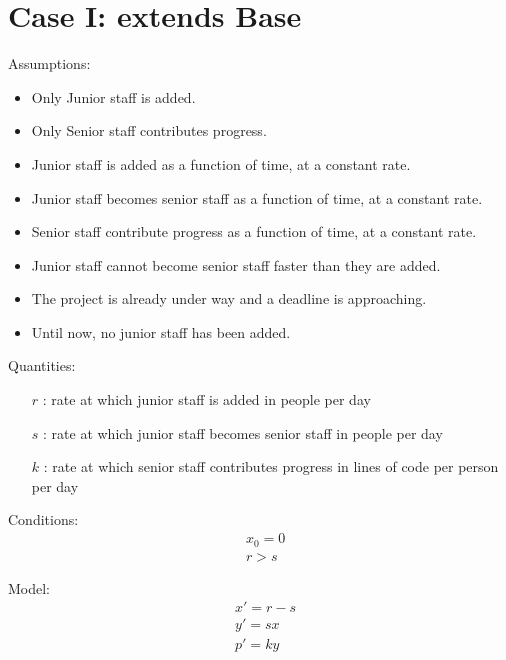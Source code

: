 \documentclass{article}
\newenvironment{atomize}
    {\begin{list} {} {
            \setlength\itemindent{0pt}
            \setlength\leftmargin{10pt}
            \setlength\labelwidth{0pt}
    }}
    {\end{list}}
\begin{document}
\section*{Case I: extends Base}
  \begin{atomize}
    \item Assumptions:
      \begin{itemize}
        \item Only Junior staff is added.
				\item Only Senior staff contributes progress.
				\item Junior staff is added as a function of time, at a constant rate.
				\item Junior staff becomes senior staff as a function of time, at a
				constant rate.
				\item Senior staff contribute progress as a function of time, at a
				constant rate.
				\item Junior staff cannot become senior staff faster than they are
				added.
				\item The project is already under way and a deadline is approaching.
				\item Until now, no junior staff has been added.
      \end{itemize}

		\item Quantities:
			\begin{itemize} 
				\item [$r$]: rate at which junior staff is added in people per day 
				\item [$s$]: rate at which junior staff becomes senior staff in people per day
				\item [$k$]: rate at which senior staff contributes progress in lines of
				code per person per day
			\end{itemize}

		\item Conditions:
  		\begin{align*}
  	  	&x_{0} = 0 \\[6pt]
  	  	&r > s
  		\end{align*}

		\item Model:
      \begin{align*}
        &x\prime = r - s \\[6pt]
        &y\prime = sx \\[6pt]
        &p\prime = ky
      \end{align*}
			\pagebreak


\end{atomize}
\end{document}
